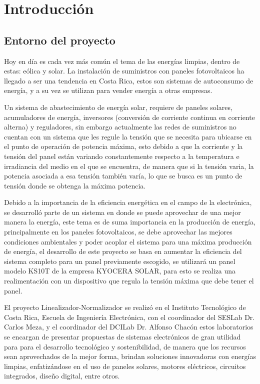 
\chapter{Introducción}
\label{chp:intro}
\section{Entorno del proyecto}

Hoy en día es cada vez más común el tema de las energías limpias, dentro de estas: eólica y solar. La instalación de suministros con paneles fotovoltaicos ha llegado a ser una tendencia en Costa Rica, estos son sistemas de autoconsumo de energía, y a su vez se utilizan para vender energía a otras empresas. 

Un sistema de abastecimiento de energía solar, requiere de paneles solares, acumuladores de energía, inversores (conversión de corriente continua en corriente alterna) y reguladores, sin embargo actualmente las redes de suministros no cuentan con un sistema que les regule la tensión que se necesita para ubicarse en el punto de operación de potencia máxima, esto debido a que la corriente y la tensión del panel están variando constantemente respecto a la temperatura e irradiancia del medio en el que se encuentra, de manera que si la tensión varia, la potencia asociada a esa tensión también varía, lo que se busca es un punto de tensión donde se obtenga la máxima potencia.
 
Debido a la importancia de la eficiencia energética en el campo de la electrónica, se desarrolló parte de un sistema en donde se puede aprovechar de una mejor manera la energía, este tema es de suma importancia en la producción de energía, principalmente en los paneles fotovoltaicos, se debe aprovechar las mejores condiciones ambientales y poder acoplar el sistema para una máxima producción de energía, el desarrollo de este proyecto se basa en aumentar la eficiencia del sistema completo para un panel previamente escogido, se utilizará un panel modelo KS10T de la empresa KYOCERA SOLAR, para esto se realiza una realimentación con un dispositivo que regula la tensión máxima que debe tener el panel. 

El proyecto Linealizador-Normalizador se realizó en el Instituto Tecnológico de Costa Rica, Escuela de Ingeniería Electrónica, con el coordinador del SESLab Dr. Carlos Meza, y el coordinador del DCILab Dr. Alfonso Chacón estos laboratorios se encargan de presentar propuestas de sistemas electrónicos de gran utilidad para  para el desarrollo tecnológico y sostenibilidad, de manera que los recursos sean aprovechados de la mejor forma, brindan soluciones innovadoras con energías limpias, enfatizándose en el uso de paneles solares, motores eléctricos, circuitos integrados, diseño digital, entre otros. 

